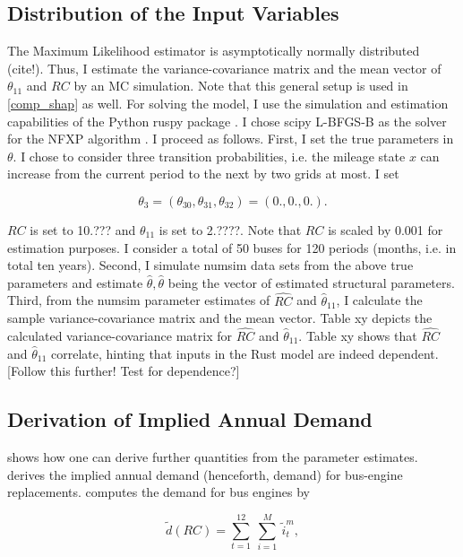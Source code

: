 \subsection{Distribution of the Input Variables}

The Maximum Likelihood estimator is asymptotically normally distributed (cite!). Thus, I estimate the variance-covariance matrix and the mean vector of $\theta_{11}$ and $RC$ by an MC simulation. Note that this general setup is used in \cref{comp_shap} as well. For solving the model, I use the simulation and estimation capabilities of the Python ruspy package \cite{OSE19}. I chose scipy L-BFGS-B as the solver for the NFXP algorithm \cite{SP20}. I proceed as follows.
First, I set the true parameters in $\theta$. I chose to consider three transition probabilities, i.e. the mileage state $x$ can increase from the current period to the next by two grids at most. I set

$$\theta_3=(\theta_{30}, \theta_{31}, \theta_{32})=(0., 0., 0.). $$

$RC$ is set to 10.??? and $\theta_{11}$ is set to 2.????. Note that $RC$ is scaled by 0.001 for estimation purposes. I consider a total of 50 buses for 120 periods (months, i.e. in total ten years).
Second, I simulate numsim data sets from the above true parameters and estimate $\hat{\theta}, \hat{\theta}$ being the vector of estimated structural parameters.
Third, from the numsim parameter estimates of $\widehat{RC}$ and ${\hat{\theta}}_{11}$, I calculate the sample variance-covariance matrix and the mean vector. Table xy depicts the calculated variance-covariance matrix for $\widehat{RC}$ and ${\hat{\theta}}_{11}$. Table xy shows that $\widehat{RC}$ and ${\hat{\theta}}_{11}$ correlate, hinting that inputs in the Rust model are indeed dependent.
[Follow this further! Test for dependence?]

\subsection{Derivation of Implied Annual Demand}

\cite{R87} shows how one can derive further quantities from the parameter estimates. \cite{R87} derives the implied annual demand (henceforth, demand) for bus-engine replacements. \cite{R87} computes the demand for bus engines by

\begin{equation}
\tilde{d}(RC)=\sum_{t=1}^{12}\ \sum_{i=1}^{M}\ {\tilde{i}}_t^m,
\end{equation}

